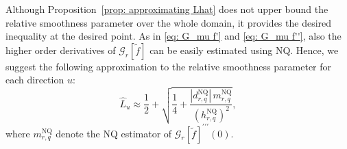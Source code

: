 Although Proposition~\ref{prop: approximating Lhat} does not upper bound the relative smoothness parameter over the whole domain, it provides the desired inequality at the desired point.
As in \eqref{eq: G_mu f'} and \eqref{eq: G_mu f''}, also the higher order derivatives of $\mathcal{G}_r [\tilde{f}]$ can be easily estimated using NQ. Hence, we suggest the following approximation to the relative smoothness parameter for each direction $u$:
\begin{equation}\label{eq: approx Lhat}
    \hat{L}_{u} \approx \frac{1}{2} + \sqrt{\frac{1}{4} + \frac{|d^{\mathrm{NQ}}_{r,q}| \,m_{r,q}^{\mathrm{NQ}}} {(h^{\mathrm{NQ}}_{r,q})^2} },
\end{equation}
where $m_{r,q}^{\mathrm{NQ}}$ denote the NQ estimator of $\mathcal{G}_r [\tilde{f}]^{\prime\prime\prime}(0)$.
